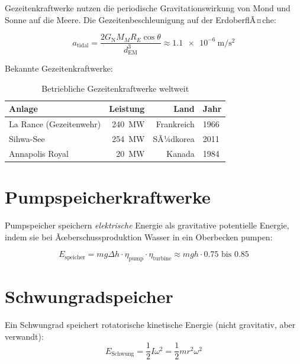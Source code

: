 ﻿\documentclass[12pt, a4paper]{report}
\theoremstyle{definition}
\theoremstyle{remark}
\newcommand{\G}{G_{\text{N}}}          %
\begin{document}
Gezeitenkraftwerke nutzen die periodische Gravitationswirkung von Mond und Sonne
auf die Meere. Die Gezeitenbeschleunigung auf der ErdoberflÃ¤che:

\begin{equation}
  a_{\text{tidal}} = \frac{2\G M_M R_E \cos\theta}{d_{\text{EM}}^3}
  \approx \SI{1.1e-6}{\metre\per\second\squared}
  \label{eq:gezeitenkraft}
\end{equation}

Bekannte Gezeitenkraftwerke:

\begin{table}[H]
  \centering
  \caption{Betriebliche Gezeitenkraftwerke weltweit}
  \label{tab:gezeiten}
  \begin{tabular}{lrrl}
    \toprule
    \textbf{Anlage} & \textbf{Leistung} & \textbf{Land} & \textbf{Jahr} \\
    \midrule
    La Rance (Gezeitenwehr) & \SI{240}{\mega\watt} & Frankreich & 1966 \\
    Sihwa-See              & \SI{254}{\mega\watt} & SÃ¼dkorea   & 2011 \\
    Annapolis Royal        & \SI{20}{\mega\watt}  & Kanada     & 1984 \\
    \bottomrule
  \end{tabular}
\end{table}

\section{Pumpspeicherkraftwerke}

Pumpspeicher speichern \emph{elektrische} Energie als gravitative potentielle
Energie, indem sie bei Ãœberschussproduktion Wasser in ein Oberbecken pumpen:

\begin{equation}
  E_{\text{speicher}} = mg\Delta h \cdot \eta_{\text{pump}} \cdot \eta_{\text{turbine}}
  \approx mgh \cdot 0.75 \text{ bis } 0.85
  \label{eq:pumpspeicher}
\end{equation}

\section{Schwungradspeicher}

Ein Schwungrad speichert rotatorische kinetische Energie (nicht gravitativ, aber verwandt):
\begin{equation}
  E_{\text{Schwung}} = \frac{1}{2}I\omega^2 = \frac{1}{2}mr^2\omega^2
  \label{eq:schwungrad}
\end{equation}
\end{document}
